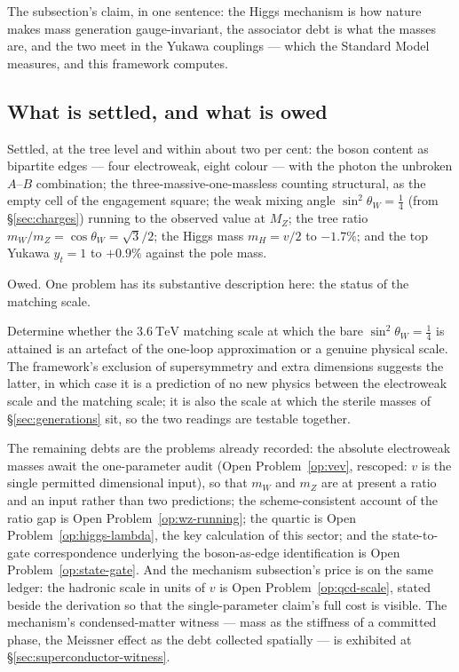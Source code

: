 The subsection's claim, in one sentence: the Higgs mechanism is how nature makes mass generation
gauge-invariant, the associator debt is what the masses are, and the two meet in the Yukawa
couplings --- which the Standard Model measures, and this framework computes.

\subsection{What is settled, and what is owed}

Settled, at the tree level and within about two per cent: the boson content as bipartite edges ---
four electroweak, eight colour --- with the photon the unbroken $A$--$B$ combination; the
three-massive-one-massless counting structural, as the empty cell of the engagement square; the weak
mixing angle $\sin^2\theta_W = \tfrac14$ (from \S\ref{sec:charges}) running to the observed value at
$M_Z$; the tree ratio $m_W/m_Z = \cos\theta_W = \sqrt3/2$; the Higgs mass $m_H = v/2$ to $-1.7\%$;
and the top Yukawa $y_t = 1$ to $+0.9\%$ against the pole mass.

Owed. One problem has its substantive description here: the status of the matching scale.

\begin{openproblem}\label{op:matching-scale}
Determine whether the $3.6\ \mathrm{TeV}$ matching scale at which the bare
$\sin^2\theta_W = \tfrac14$ is attained is an artefact of the one-loop approximation or a genuine
physical scale. The framework's exclusion of supersymmetry and extra dimensions suggests the latter,
in which case it is a prediction of no new physics between the electroweak scale and the matching
scale; it is also the scale at which the sterile masses of \S\ref{sec:generations} sit, so the two
readings are testable together.
\end{openproblem}

The remaining debts are the problems already recorded: the absolute electroweak masses await the one-parameter
audit (Open Problem~\ref{op:vev}, rescoped: $v$ is the single permitted dimensional input), so that $m_W$ and $m_Z$ are at present a ratio and an
input rather than two predictions; the scheme-consistent account of the ratio gap is
Open Problem~\ref{op:wz-running}; the quartic is Open Problem~\ref{op:higgs-lambda}, the key
calculation of this sector; and the state-to-gate correspondence underlying the boson-as-edge
identification is Open Problem~\ref{op:state-gate}. And the mechanism subsection's price is on the same ledger: the hadronic scale in
units of $v$ is Open Problem~\ref{op:qcd-scale}, stated beside the derivation so that the
single-parameter claim's full cost is visible. The mechanism's condensed-matter witness --- mass as
the stiffness of a committed phase, the Meissner effect as the debt collected spatially --- is
exhibited at \S\ref{sec:superconductor-witness}.

